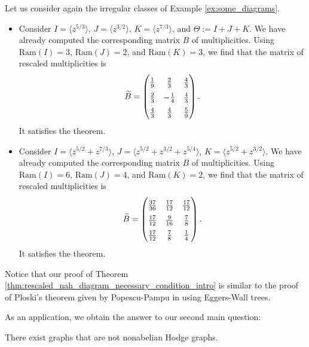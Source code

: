 \documentclass[11pt,a4paper]{amsart}
\numberwithin{equation}{section}
\newcommand{\cir}[1]{\langle #1 \rangle}
\begin{document}
\begin{example} Let us consider again the irregular classes of Example \ref{ex:some_diagrams}.
\begin{itemize}
\item Consider $I=\cir{z^{5/3}}$, $J=\cir{z^{3/2}}$, $K=\cir{z^{7/3}}$, and $\Theta:=I+J+K$. We have already computed the corresponding matrix $B$ of multiplicities. Using $\mathrm{Ram}(I)=3$, $\mathrm{Ram}(J)=2$, and $\mathrm{Ram}(K)=3$, we find that the matrix of rescaled multiplicities is 
\[
\begingroup
\renewcommand*{\arraystretch}{1.5}
\widetilde B=\begin{pmatrix}
\frac{1}{9} & \frac{2}{3} & \frac{4}{3}\\
\frac{2}{3} & -\frac{1}{4} & \frac{4}{3}\\
\frac{4}{3} & \frac{4}{3} & \frac{5}{9}\\
\end{pmatrix}.
\endgroup
\]
It satisfies the theorem.
\item Consider $I=\cir{z^{5/2}+z^{7/3}}$, $J=\cir{z^{5/2}+z^{3/2}+z^{5/4}}$, $K=\cir{z^{5/2}+z^{3/2}}$.
We have already computed the corresponding matrix $B$ of multiplicities. Using $\mathrm{Ram}(I)=6$, $\mathrm{Ram}(J)=4$, and $\mathrm{Ram}(K)=2$, we find that the matrix of rescaled multiplicities is 
\[
\begingroup
\renewcommand*{\arraystretch}{1.5}
\widetilde B=\begin{pmatrix}
\frac{37}{36} & \frac{17}{12} & \frac{17}{12} \\
\frac{17}{12} & \frac{9}{16} & \frac{7}{8} \\
\frac{17}{12} & \frac{7}{8} & \frac{1}{4}
\end{pmatrix}.
\endgroup
\]
It satisfies the theorem.
\end{itemize}
\end{example}


\begin{remark}
Notice that our proof of Theorem \ref{thm:rescaled_nah_diagram_necessary_condition_intro} is similar to the proof of Ploski's theorem given by Popescu-Pampu in \cite[§4]{popescu2020ultrametrics} using Eggers-Wall trees.
\end{remark}

As an application, we obtain the answer to our second main question:

\begin{proposition}
\label{prop:counter_example_nah_graph}
There exist graphs that are not nonabelian Hodge graphs.
\end{proposition}
\end{document}

